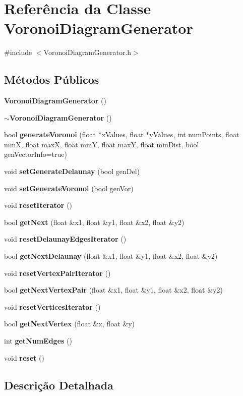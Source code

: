 \section{Referência da Classe Voronoi\+Diagram\+Generator}
\label{class_voronoi_diagram_generator}


{\ttfamily \#include $<$Voronoi\+Diagram\+Generator.\+h$>$}

\subsection*{Métodos Públicos}
\begin{DoxyCompactItemize}
\item 
{\bf Voronoi\+Diagram\+Generator} ()
\item 
{\bf $\sim$\+Voronoi\+Diagram\+Generator} ()
\item 
bool {\bf generate\+Voronoi} (float $\ast$x\+Values, float $\ast$y\+Values, int num\+Points, float minX, float maxX, float minY, float maxY, float min\+Dist, bool gen\+Vector\+Info=true)
\item 
void {\bf set\+Generate\+Delaunay} (bool gen\+Del)
\item 
void {\bf set\+Generate\+Voronoi} (bool gen\+Vor)
\item 
void {\bf reset\+Iterator} ()
\item 
bool {\bf get\+Next} (float \&x1, float \&y1, float \&x2, float \&y2)
\item 
void {\bf reset\+Delaunay\+Edges\+Iterator} ()
\item 
bool {\bf get\+Next\+Delaunay} (float \&x1, float \&y1, float \&x2, float \&y2)
\item 
void {\bf reset\+Vertex\+Pair\+Iterator} ()
\item 
bool {\bf get\+Next\+Vertex\+Pair} (float \&x1, float \&y1, float \&x2, float \&y2)
\item 
void {\bf reset\+Vertices\+Iterator} ()
\item 
bool {\bf get\+Next\+Vertex} (float \&x, float \&y)
\item 
int {\bf get\+Num\+Edges} ()
\item 
void {\bf reset} ()
\end{DoxyCompactItemize}


\subsection{Descrição Detalhada}


